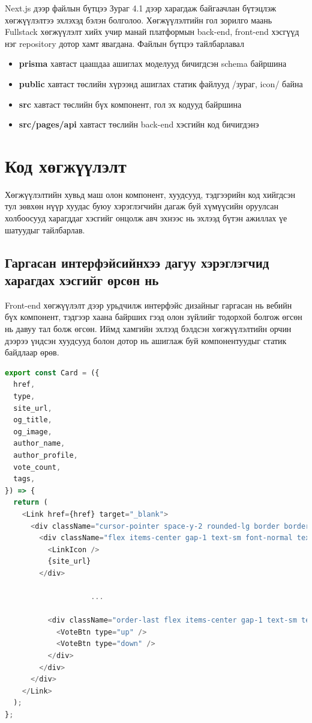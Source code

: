 Next.js дээр файлын бүтцээ Зураг 4.1 дээр харагдаж байгаачлан бүтэцлэж хөгжүүлэлтээ эхлэхэд бэлэн болголоо. Хөгжүүлэлтийн гол зорилго маань Fullstack хөгжүүлэлт хийх учир манай платформын back-end, front-end хэсгүүд нэг repository дотор хамт явагдана. Файлын бүтцээ тайлбарлавал

\begin{itemize}
	\item \textbf{prisma} хавтаст цаашдаа ашиглах моделууд бичигдсэн schema байршина
	\item \textbf{public} хавтаст төслийн хүрээнд ашиглах статик файлууд /зураг, icon/ байна
	\item \textbf{src} хавтаст төслийн бүх компонент, гол эх кодууд байршина
	\item \textbf{src/pages/api} хавтаст төслийн back-end хэсгийн код бичигдэнэ
\end{itemize}

\section{Код хөгжүүлэлт}

Хөгжүүлэлтийн хувьд маш олон компонент, хуудсууд, тэдгээрийн код хийгдсэн тул зөвхөн нүүр хуудас буюу хэрэглэгчийн дагаж буй хүмүүсийн оруулсан холбоосууд харагддаг хэсгийг онцолж авч эхнээс нь эхлээд бүтэн ажиллах үе шатуудыг тайлбарлав.

\subsection{Гаргасан интерфэйсийнхээ дагуу хэрэглэгчид харагдах хэсгийг өрсөн нь}

Front-end хөгжүүлэлт дээр урьдчилж интерфэйс дизайныг гаргасан нь вебийн бүх компонент, тэдгээр хаана байрших гээд олон зүйлийг тодорхой болгож өгсөн нь давуу тал болж өгсөн. Иймд хамгийн эхлээд бэлдсэн хөгжүүлэлтийн орчин дээрээ үндсэн хуудсууд болон дотор нь ашиглаж буй компонентуудыг статик байдлаар өрөв. 

\begin{lstlisting}[language=Javascript, caption=Хэрэглэгчийн оруулсан холбоосыг харагдах компонент, frame=single]
	export const Card = ({
  href,
  type,
  site_url,
  og_title,
  og_image,
  author_name,
  author_profile,
  vote_count,
  tags,
}) => {
  return (
    <Link href={href} target="_blank">
      <div className="cursor-pointer space-y-2 rounded-lg border border-gray200 bg-gray300 p-3.5 transition-all duration-300 hover:border-gray100 hover:bg-white hover:shadow-sm">
        <div className="flex items-center gap-1 text-sm font-normal text-description">
          <LinkIcon />
          {site_url}
        </div>
	       
					...

          <div className="order-last flex items-center gap-1 text-sm text-description">
            <VoteBtn type="up" />
            <VoteBtn type="down" />
          </div>
        </div>
      </div>
    </Link>
  );
};
			
\end{lstlisting}


